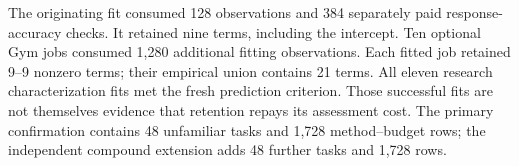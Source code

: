 The originating fit consumed 128 observations and 384 separately paid response-accuracy checks. It retained nine terms, including the intercept. Ten optional Gym jobs consumed 1,280 additional fitting observations. Each fitted job retained 9--9 nonzero terms; their empirical union contains 21 terms. All eleven research characterization fits met the fresh prediction criterion. Those successful fits are not themselves evidence that retention repays its assessment cost. The primary confirmation contains 48 unfamiliar tasks and 1,728 method--budget rows; the independent compound extension adds 48 further tasks and 1,728 rows.
